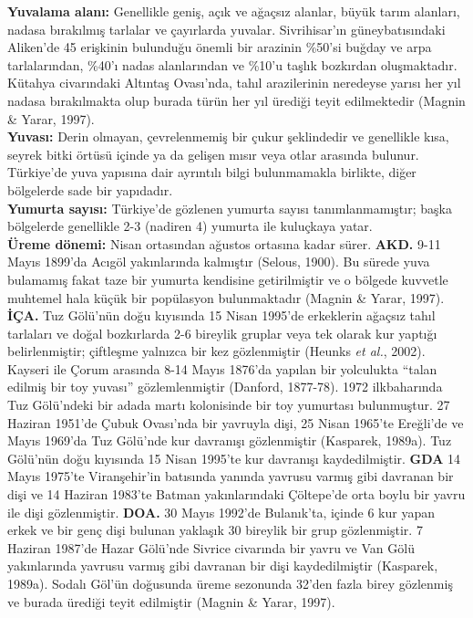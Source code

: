 \documentclass[
  a4paper,
  DIV=11,
  numbers=noendperiod]{scrreprt}
\begin{document}
\textbf{Yuvalama alanı:} Genellikle geniş, açık ve ağaçsız alanlar,
büyük tarım alanları, nadasa bırakılmış tarlalar ve çayırlarda yuvalar.
Sivrihisar'ın güneybatısındaki Aliken'de 45 erişkinin bulunduğu önemli
bir arazinin \%50'si buğday ve arpa tarlalarından, \%40'ı nadas
alanlarından ve \%10'u taşlık bozkırdan oluşmaktadır. Kütahya
civarındaki Altıntaş Ovası'nda, tahıl arazilerinin neredeyse yarısı her
yıl nadasa bırakılmakta olup burada türün her yıl ürediği teyit
edilmektedir (Magnin \& Yarar, 1997).\\
\textbf{Yuvası:} Derin olmayan, çevrelenmemiş bir çukur şeklindedir ve
genellikle kısa, seyrek bitki örtüsü içinde ya da gelişen mısır veya
otlar arasında bulunur. Türkiye'de yuva yapısına dair ayrıntılı bilgi
bulunmamakla birlikte, diğer bölgelerde sade bir yapıdadır.\\
\textbf{Yumurta sayısı:} Türkiye'de gözlenen yumurta sayısı
tanımlanmamıştır; başka bölgelerde genellikle 2-3 (nadiren 4) yumurta
ile kuluçkaya yatar.\\
\textbf{Üreme dönemi:} Nisan ortasından ağustos ortasına kadar sürer.
\textbf{AKD.} 9-11 Mayıs 1899'da Acıgöl yakınlarında kalmıştır (Selous,
1900). Bu sürede yuva bulamamış fakat taze bir yumurta kendisine
getirilmiştir ve o bölgede kuvvetle muhtemel hala küçük bir popülasyon
bulunmaktadır (Magnin \& Yarar, 1997). \textbf{İÇA.} Tuz Gölü'nün doğu
kıyısında 15 Nisan 1995'de erkeklerin ağaçsız tahıl tarlaları ve doğal
bozkırlarda 2-6 bireylik gruplar veya tek olarak kur yaptığı
belirlenmiştir; çiftleşme yalnızca bir kez gözlenmiştir (Heunks \emph{et
al.}, 2002). Kayseri ile Çorum arasında 8-14 Mayıs 1876'da yapılan bir
yolculukta ``talan edilmiş bir toy yuvası'' gözlemlenmiştir (Danford,
1877-78). 1972 ilkbaharında Tuz Gölü'ndeki bir adada martı kolonisinde
bir toy yumurtası bulunmuştur. 27 Haziran 1951'de Çubuk Ovası'nda bir
yavruyla dişi, 25 Nisan 1965'te Ereğli'de ve Mayıs 1969'da Tuz Gölü'nde
kur davranışı gözlenmiştir (Kasparek, 1989a). Tuz Gölü'nün doğu
kıyısında 15 Nisan 1995'te kur davranışı kaydedilmiştir. \textbf{GDA} 14
Mayıs 1975'te Viranşehir'in batısında yanında yavrusu varmış gibi
davranan bir dişi ve 14 Haziran 1983'te Batman yakınlarındaki Çöltepe'de
orta boylu bir yavru ile dişi gözlenmiştir. \textbf{DOA.} 30 Mayıs
1992'de Bulanık'ta, içinde 6 kur yapan erkek ve bir genç dişi bulunan
yaklaşık 30 bireylik bir grup gözlenmiştir. 7 Haziran 1987'de Hazar
Gölü'nde Sivrice civarında bir yavru ve Van Gölü yakınlarında yavrusu
varmış gibi davranan bir dişi kaydedilmiştir (Kasparek, 1989a). Sodalı
Göl'ün doğusunda üreme sezonunda 32'den fazla birey gözlenmiş ve burada
ürediği teyit edilmiştir (Magnin \& Yarar, 1997).
\end{document}

